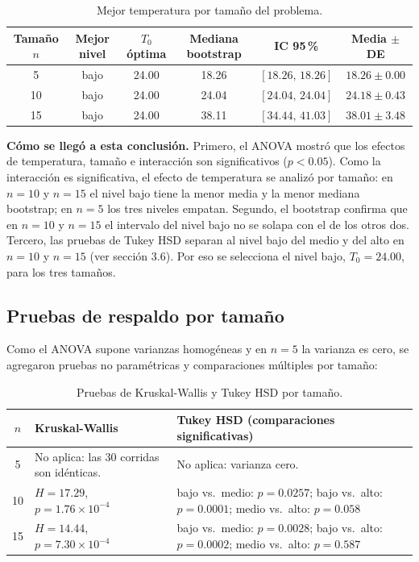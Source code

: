 \documentclass[11pt,letterpaper]{article}
\begin{document}
\begin{table}[H]
  \centering
  \caption{Mejor temperatura por tamaño del problema.}
  \label{tab:resumen}
  \small
  \setlength{\tabcolsep}{5pt}
  \renewcommand{\arraystretch}{1.15}
  \begin{tabular}{@{}cccccc@{}}
    \toprule
    Tamaño $n$ & Mejor nivel & $T_0$ óptima & Mediana bootstrap & IC 95\,\% & Media $\pm$ DE \\
    \midrule
    5  & bajo & 24.00 & 18.26 & $[18.26,\, 18.26]$ & $18.26 \pm 0.00$ \\
    10 & bajo & 24.00 & 24.04 & $[24.04,\, 24.04]$ & $24.18 \pm 0.43$ \\
    15 & bajo & 24.00 & 38.11 & $[34.44,\, 41.03]$ & $38.01 \pm 3.48$ \\
    \bottomrule
  \end{tabular}
\end{table}

\textbf{Cómo se llegó a esta conclusión.} Primero, el ANOVA mostró que los
efectos de temperatura, tamaño e interacción son significativos
($p < 0.05$). Como la interacción es significativa, el efecto de temperatura
se analizó por tamaño: en $n = 10$ y $n = 15$ el nivel bajo tiene la menor
media y la menor mediana bootstrap; en $n = 5$ los tres niveles empatan.
Segundo, el bootstrap confirma que en $n = 10$ y $n = 15$ el intervalo del
nivel bajo no se solapa con el de los otros dos. Tercero, las pruebas de Tukey
HSD separan al nivel bajo del medio y del alto en $n = 10$ y $n = 15$ (ver
sección 3.6). Por eso se selecciona el nivel bajo, $T_0 = 24.00$, para los
tres tamaños.

\subsection{Pruebas de respaldo por tamaño}

Como el ANOVA supone varianzas homogéneas y en $n = 5$ la varianza es cero, se
agregaron pruebas no paramétricas y comparaciones múltiples por tamaño:

\begin{table}[H]
  \centering
  \caption{Pruebas de Kruskal-Wallis y Tukey HSD por tamaño.}
  \label{tab:posthoc}
  \small
  \renewcommand{\arraystretch}{1.2}
  \begin{tabularx}{\linewidth}{@{}c
      >{\raggedright\arraybackslash}p{4.3cm}
      >{\raggedright\arraybackslash}X@{}}
    \toprule
    $n$ & Kruskal-Wallis & Tukey HSD (comparaciones significativas) \\
    \midrule
    5  & No aplica: las 30 corridas son idénticas.
       & No aplica: varianza cero. \\
    10 & $H = 17.29$, $p = 1.76\times10^{-4}$
       & bajo vs.\ medio: $p = 0.0257$; bajo vs.\ alto: $p = 0.0001$;
         medio vs.\ alto: $p = 0.058$ \\
    15 & $H = 14.44$, $p = 7.30\times10^{-4}$
       & bajo vs.\ medio: $p = 0.0028$; bajo vs.\ alto: $p = 0.0002$;
         medio vs.\ alto: $p = 0.587$ \\
    \bottomrule
  \end{tabularx}
\end{table}
\end{document}
